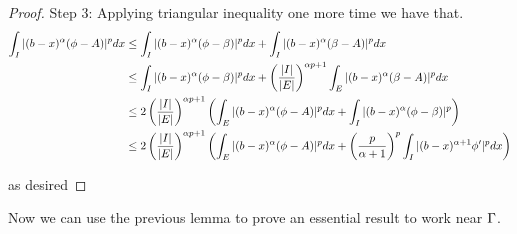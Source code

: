 \begin{proof}
Step 3:
Applying triangular inequality one more time we have that.
\begin{align*}
    \int_I|(b-x)^\alpha(\phi-A)|^p d x &\leq \int_I|(b-x)^\alpha(\phi-\beta)|^p d x + \int_I|(b-x)^\alpha(\beta-A)|^p d x\\
     &\leq \int_I|(b-x)^\alpha(\phi-\beta)|^p d x + \left(\frac{|I|}{|E|}\right)^{\alpha p+1}\int_E|(b-x)^\alpha(\beta-A)|^p d x\\
     &\leq 2 \left(\frac{|I|}{|E|}\right)^{\alpha p+1}\left(\int_E|(b-x)^\alpha(\phi-A)|^p d x+\int_I|(b-x)^\alpha(\phi-\beta)|^p\right)\\
    &\leq 2 \left(\frac{|I|}{|E|}\right)^{\alpha p+1}\left(\int_E|(b-x)^\alpha(\phi-A)|^p d x+\left(\frac{p}{\alpha+1}\right)^p\int_I|(b-x)^{\alpha+1}\phi'|^p d x\right) 
\end{align*}

as desired
\end{proof}


Now we can use the previous lemma to prove an essential result to work near $\Gamma$. 

